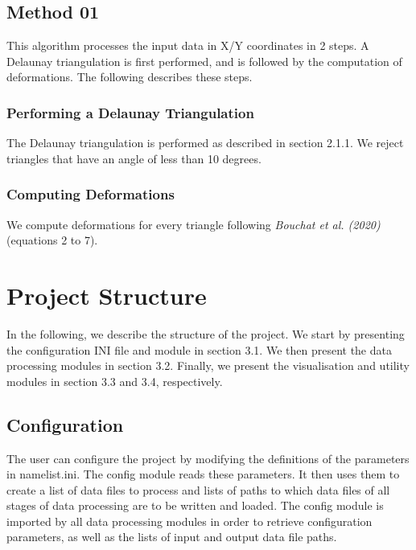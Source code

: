 \documentclass[draft]{agujournal2018}
\begin{document}
\subsection{Method 01}

This algorithm processes the input data in X/Y coordinates in 2 steps. A Delaunay triangulation is first performed, and is followed by the computation of deformations. The following describes these steps.

\subsubsection{Performing a Delaunay Triangulation}

The Delaunay triangulation is performed as described in section 2.1.1. We reject triangles that have an angle of less than 10 degrees.

\subsubsection{Computing Deformations}

We compute deformations for every triangle following \textit{Bouchat et al. (2020)} (equations 2 to 7).

\section{Project Structure}

In the following, we describe the structure of the project. We start by presenting the configuration INI file and module in section 3.1. We then present the data processing modules in section 3.2. Finally, we present the visualisation and utility modules in section 3.3 and 3.4, respectively. 



\subsection{Configuration}

The user can configure the project by modifying the definitions of the parameters in namelist.ini. The config module reads these parameters. It then uses them to create a list of data files to process and lists of paths to which data files of all stages of data processing are to be written and loaded. The config module is imported by all data processing modules in order to retrieve configuration parameters, as well as the lists of input and output data file paths.
\end{document}
